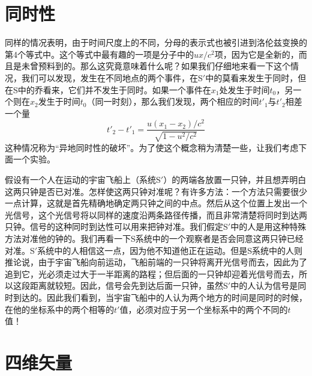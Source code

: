 \section{同时性}

同样的情况表明，由于时间尺度上的不同，分母的表示式也被引进到洛伦兹变换的第4个等式中。这个等式中最有趣的一项是分子中的$ux/c^2$项，因为它是全新的，而且是未曾预料到的。那么这究竟意味着什么呢？如果我们仔细地来看一下这个情况，我们可以发现，发生在不同地点的两个事件，在S$'$中的莫看来发生于同时，但在S中的乔看来，它们并不发生于同时。如果一个事件在$x_1$处发生于时间$t_0$，另一个则在$x_2$发生于时间$t_0$（同一时刻），那么我们发现，两个相应的时间$t'_1$与$t'_2$相差一个量
\begin{equation*}
    t'_2-t'_1 = \frac{u(x_1-x_2)/c^2}{\sqrt{1-u^2/c^2}}
\end{equation*}
这种情况称为“异地同时性的破坏”。为了使这个概念稍为清楚一些，让我们考虑下面一个实验。

假设有一个人在运动的宇宙飞船上（系统S$'$）的两端各放置一只钟，并且想弄明白这两只钟是否已对准。怎样使这两只钟对准呢？有许多方法：一个方法只需要很少一点计算，这就是首先精确地确定两只钟之间的中点。然后从这个位置上发出一个光信号，这个光信号将以同样的速度沿两条路径传播，而且非常清楚将同时到达两只钟。信号的这种同时到达性可以用来把钟对准。我们假定S$'$中的人是用这种特殊方法对准他的钟的。我们再看一下S系统中的一个观察者是否会同意这两只钟已经对准。S$'$系统中的人相信这一点，因为他不知道他正在运动。但是S系统中的人则推论说，由于宇宙飞船向前运动，飞船前端的一只钟将离开光信号而去，因此为了追到它，光必须走过大于一半距离的路程；但后面的一只钟却迎着光信号而去，所以这段距离就较短。因此，信号会先到达后面一只钟，虽然S$'$中的人认为信号是同时到达的。因此我们看到，当宇宙飞船中的人认为两个地方的时间是同时的时候，在他的坐标系中的两个相等的$t'$值，必须对应于另一个坐标系中的两个不同的$t$值！

\section{四维矢量}


